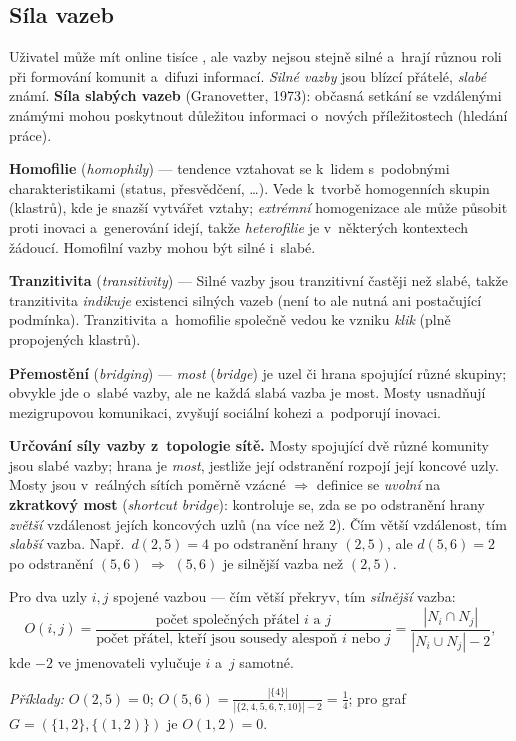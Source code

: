 \documentclass[11pt,a4paper]{article}
\theoremstyle{definition}
\begin{document}
\subsection{Síla vazeb}

Uživatel může mít online tisíce , ale vazby nejsou stejně silné a~hrají různou roli
při formování komunit a~difuzi informací. \emph{Silné vazby} jsou blízcí přátelé, \emph{slabé}
známí. \textbf{Síla slabých vazeb} (Granovetter, 1973): občasná setkání se vzdálenými známými
mohou poskytnout důležitou informaci o~nových příležitostech (hledání práce).

\begin{defbox}
\textbf{Homofilie} (\emph{homophily}) --- tendence vztahovat se k~lidem s~podobnými
charakteristikami (status, přesvědčení, \dots). Vede k~tvorbě homogenních skupin (klastrů),
kde je snazší vytvářet vztahy; \emph{extrémní} homogenizace ale může působit proti inovaci
a~generování idejí, takže \emph{heterofilie} je v~některých kontextech žádoucí. Homofilní
vazby mohou být silné i~slabé.

\textbf{Tranzitivita} (\emph{transitivity}) ---  Silné vazby jsou tranzitivní
častěji než slabé, takže tranzitivita \emph{indikuje} existenci silných vazeb (není to ale
nutná ani postačující podmínka). Tranzitivita a~homofilie společně vedou ke vzniku
\emph{klik} (plně propojených klastrů).

\textbf{Přemostění} (\emph{bridging}) --- \emph{most} (\emph{bridge}) je uzel či hrana
spojující různé skupiny; obvykle jde o~slabé vazby, ale ne každá slabá vazba je most. Mosty
usnadňují mezigrupovou komunikaci, zvyšují sociální kohezi a~podporují inovaci.
\end{defbox}

\textbf{Určování síly vazby z~topologie sítě.} Mosty spojující dvě různé komunity jsou slabé
vazby; hrana je \emph{most}, jestliže její odstranění rozpojí její koncové uzly. Mosty jsou
v~reálných sítích poměrně vzácné $\Rightarrow$ definice se \emph{uvolní} na \textbf{zkratkový
most} (\emph{shortcut bridge}): kontroluje se, zda se po odstranění hrany \emph{zvětší}
vzdálenost jejích koncových uzlů (na více než 2). Čím větší vzdálenost, tím \emph{slabší}
vazba. Např.\ $d(2,5)=4$ po odstranění hrany $(2,5)$, ale $d(5,6)=2$ po odstranění $(5,6)$
$\Rightarrow$ $(5,6)$ je silnější vazba než $(2,5)$.

\begin{defbox}
Pro dva uzly $i,j$ spojené vazbou --- čím větší překryv, tím \emph{silnější} vazba:
\[ O(i,j)=\frac{\text{počet společných přátel } i \text{ a } j}
   {\text{počet přátel, kteří jsou sousedy alespoň }i\text{ nebo }j}
   =\frac{|N_i\cap N_j|}{|N_i\cup N_j|-2}, \]
kde $-2$ ve jmenovateli vylučuje $i$ a~$j$ samotné.

\emph{Příklady:} $O(2,5)=0$; $O(5,6)=\frac{|\{4\}|}{|\{2,4,5,6,7,10\}|-2}=\frac14$;
pro graf $G=(\{1,2\},\{(1,2)\})$ je $O(1,2)=0$.
\end{defbox}
\end{document}
